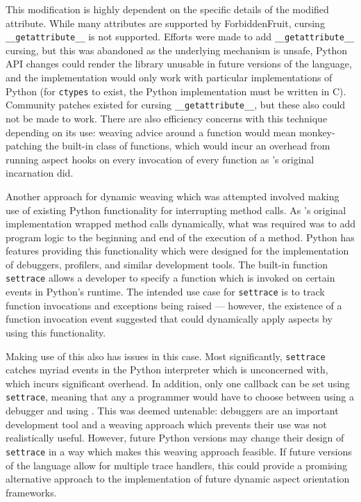 This modification is highly dependent on the specific details of the modified
attribute. While many attributes are supported by ForbiddenFruit, cursing
\lstinline{__getattribute__} is not supported. Efforts were made to add
\lstinline{__getattribute__} cursing, but this was abandoned as the underlying
mechanism is unsafe, Python API changes could render the library unusable in
future versions of the language, and the implementation would only work with
particular implementations of Python (for \lstinline{ctypes} to exist, the
Python implementation must be written in C). Community patches existed for
cursing \lstinline{__getattribute__}, but these also could not be made to work.
There are also efficiency concerns with this technique depending on its use:
weaving advice around a function would mean monkey-patching the built-in class
of functions, which would incur an overhead from running aspect hooks on every
invocation of every function as \pdsf{}'s original incarnation did.

Another approach for dynamic weaving which was attempted involved making use of
existing Python functionality for interrupting method calls. As \pdsf{}'s
original implementation wrapped method calls dynamically, what was required was
to add program logic to the beginning and end of the execution of a method.
Python has features providing this functionality which were designed for the
implementation of debuggers, profilers, and similar development tools.
The built-in function \lstinline{settrace} allows a developer to specify a function
which is invoked on certain events in Python's runtime. The intended use case
for \lstinline{settrace} is to track function invocations and exceptions being
raised --- however, the existence of a function invocation event suggested that \pdsf{}
could dynamically apply aspects by using this functionality.

Making use of this also has issues in this case. Most significantly,
\lstinline{settrace} catches myriad events in the Python interpreter which
\pdsf{} is unconcerned with, which incurs significant overhead. In addition,
only one callback can be set using \lstinline{settrace}, meaning that any a
programmer would have to choose between using a debugger and using \pdsf{}. This
was deemed untenable: debuggers are an important development tool and a weaving
approach which prevents their use was not realistically useful. However, future
Python versions may change their design of \lstinline{settrace} in a way which
makes this weaving approach feasible. If future versions of the language allow
for multiple trace handlers, this could provide a promising alternative approach
to the implementation of future dynamic aspect orientation frameworks.


